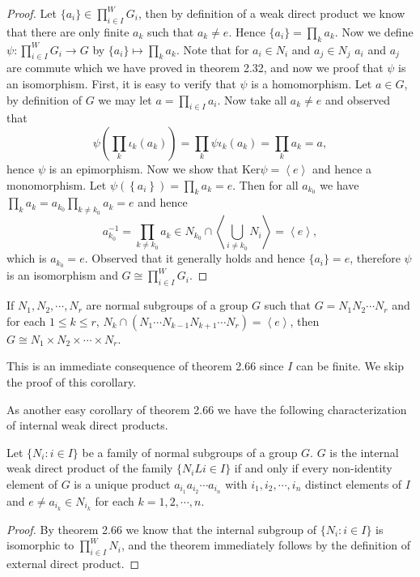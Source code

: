 \begin{proof}
Let $\{a_i\}\in{\prod}^W_{i\in I}G_i$, then by definition of a weak direct product we know that there are only finite $a_k$ such that $a_k\ne e$. Hence $\{a_i\}=\prod_{k}a_k$. Now we define $\psi:{\prod}^W_{i\in I}G_i\to G$ by $\{a_i\}\mapsto\prod_{k}a_k$. Note that for $a_i\in N_i$ and $a_j\in N_j$ $a_i$ and $a_j$ are commute which we have proved in theorem 2.32, and now we proof that $\psi$ is an isomorphism. First, it is easy to verify that $\psi$ is a homomorphism. Let $a\in G$, by definition of $G$ we may let $a=\prod_{i\in I}a_i$. Now take all $a_k\ne e$ and observed that 
$$
\psi \left( \prod_k{\iota _k\left( a_k \right)} \right) =\prod_k{\psi \iota _k\left( a_k \right)}=\prod_k{a_k}=a,
$$
hence $\psi$ is an epimorphism. Now we show that $\mathrm{Ker}\psi=\left<e\right>$ and hence a monomorphism. Let $\psi \left( \left\{ a_i \right\} \right) =\prod_k{a_k}=e$. Then for all $a_{k_0}$ we have $\prod_k{a_k}=a_{k_0}\prod_{k\ne k_0}{a_k}=e$ and hence 
$$
a_{k_0}^{-1}=\prod_{k\ne k_0}{a_k}\in N_{k_0}\cap \left< \bigcup_{i\ne k_0}{N_i} \right> =\left< e \right> ,
$$
which is $a_{k_0}=e$. Observed that it generally holds and hence $\{a_i\}=e$, therefore $\psi$ is an isomorphism and $G\cong{\prod}^W_{i\in I}G_i$.
\end{proof}
\begin{corollary}
If $N_1,N_2,\cdots,N_r$ are normal subgroups of a group $G$ such that $G=N_1N_2\cdots N_r$ and for each $1\le k\le r$, $N_k\cap(N_1\cdots N_{k-1}N_{k+1}\cdots N_r)=\left<e\right>$, then $G\cong N_1\times N_2\times\cdots\times N_r$.
\end{corollary}
This is an immediate consequence of theorem 2.66 since $I$ can be finite. We skip the proof of this corollary.\par
As another easy corollary of theorem 2.66 we have the following characterization of internal weak direct products.
\begin{theorem}
Let $\{N_i:i\in I\}$ be a family of normal subgroups of a group $G$. $G$ is the internal weak direct product of the family $\{N_iLi\in I\}$ if and only if every non-identity element of $G$ is a unique product $a_{i_1}a_{i_2}\cdots a_{i_n}$ with $i_1,i_2,\cdots,i_n$ distinct elements of $I$ and $e\ne a_{i_k}\in N_{i_k}$ for each $k=1,2,\cdots,n$.
\end{theorem}
\begin{proof}
By theorem 2.66 we know that the internal subgroup of $\{N_i:i\in I\}$ is isomorphic to ${\prod}^W_{i\in I}N_i$, and the theorem immediately follows by the definition of external direct product.
\end{proof}
